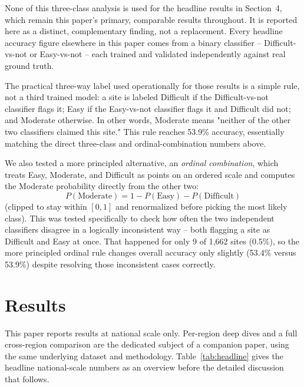 \documentclass[11pt,a4paper]{article}
\begin{document}
None of this three-class analysis is used for the headline results in Section~4, which remain this paper's primary, comparable results throughout. It is reported here as a distinct, complementary finding, not a replacement. Every headline accuracy figure elsewhere in this paper comes from a binary classifier -- Difficult-vs-not or Easy-vs-not -- each trained and validated independently against real ground truth.

The practical three-way label used operationally for those results is a simple rule, not a third trained model: a site is labeled Difficult if the Difficult-vs-not classifier flags it; Easy if the Easy-vs-not classifier flags it and Difficult did not; and Moderate otherwise. In other words, Moderate means "neither of the other two classifiers claimed this site." This rule reaches 53.9\% accuracy, essentially matching the direct three-class and ordinal-combination numbers above.

We also tested a more principled alternative, an \emph{ordinal combination}, which treats Easy, Moderate, and Difficult as points on an ordered scale and computes the Moderate probability directly from the other two:
\begin{equation}
P(\text{Moderate}) = 1 - P(\text{Easy}) - P(\text{Difficult})
\end{equation}
(clipped to stay within $[0,1]$ and renormalized before picking the most likely class). This was tested specifically to check how often the two independent classifiers disagree in a logically inconsistent way -- both flagging a site as Difficult and Easy at once. That happened for only 9 of 1{,}662 sites (0.5\%), so the more principled ordinal rule changes overall accuracy only slightly (53.4\% versus 53.9\%) despite resolving those inconsistent cases correctly.

\section{Results}
This paper reports results at national scale only. Per-region deep dives and a full cross-region comparison are the dedicated subject of a companion paper, using the same underlying dataset and methodology. Table~\ref{tab:headline} gives the headline national-scale numbers as an overview before the detailed discussion that follows.
\end{document}
